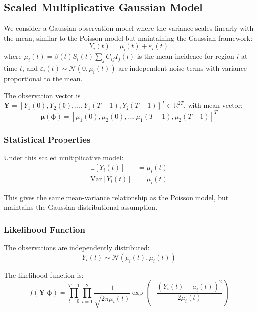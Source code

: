 \subsection{Scaled Multiplicative Gaussian Model}

We consider a Gaussian observation model where the variance scales linearly with the mean, similar to the Poisson model but maintaining the Gaussian framework:
\begin{equation}
Y_i(t) = \mu_i(t) + \varepsilon_i(t)
\end{equation}
where $\mu_i(t) = \beta(t) S_i(t) \sum_j C_{ij} I_j(t)$ is the mean incidence for region $i$ at time $t$, and $\varepsilon_i(t) \sim \mathcal{N}(0, \mu_i(t))$ are independent noise terms with variance proportional to the mean.

The observation vector is $\mathbf{Y} = [Y_1(0), Y_2(0), \ldots, Y_1(T-1), Y_2(T-1)]^T \in \mathbb{R}^{2T}$, with mean vector:
\begin{equation}
\boldsymbol{\mu}(\boldsymbol{\phi}) = [\mu_1(0), \mu_2(0), \ldots, \mu_1(T-1), \mu_2(T-1)]^T
\end{equation}

\subsubsection{Statistical Properties}

Under this scaled multiplicative model:
\begin{align}
\mathbb{E}[Y_i(t)] &= \mu_i(t) \\
\text{Var}[Y_i(t)] &= \mu_i(t)
\end{align}

This gives the same mean-variance relationship as the Poisson model, but maintains the Gaussian distributional assumption.

\subsubsection{Likelihood Function}

The observations are independently distributed:
\begin{equation}
Y_i(t) \sim \mathcal{N}(\mu_i(t), \mu_i(t))
\end{equation}

The likelihood function is:
\begin{equation}
f(\mathbf{Y}|\boldsymbol{\phi}) = \prod_{t=0}^{T-1} \prod_{i=1}^{2} \frac{1}{\sqrt{2\pi\mu_i(t)}} \exp\left(-\frac{(Y_i(t) - \mu_i(t))^2}{2\mu_i(t)}\right)
\end{equation}

